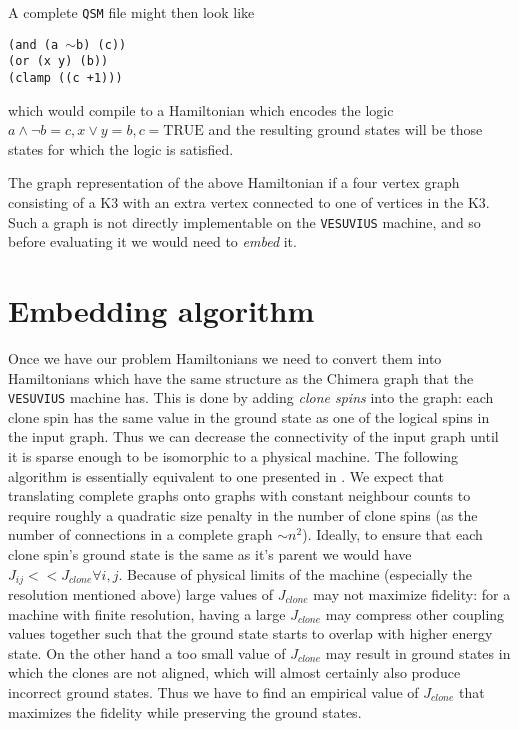A complete \texttt{QSM} file might then look like

\begin{center}
	\texttt{(and (a $\sim$b) (c))}\\
	\texttt{(or (x y) (b))}\\
	\texttt{(clamp ((c +1)))}
\end{center}
which would compile to a Hamiltonian which encodes the logic $a \wedge \neg b = c, x \vee y = b, c = \text{TRUE}$ and the resulting ground states will be those states for which the logic is satisfied.

The graph representation of the above Hamiltonian if a four vertex graph consisting of a K3 with an extra vertex connected to one of vertices in the K3.  Such a graph is not directly implementable on the \texttt{VESUVIUS} machine, and so before evaluating it we would need to \emph{embed} it.

\section{Embedding algorithm}
\label{sec:embed_algo}
Once we have our problem Hamiltonians we need to convert them into Hamiltonians which have the same structure as the Chimera graph that the \texttt{VESUVIUS} machine has.  This is done by adding \emph{clone spins} into the graph: each clone spin has the same value in the ground state as one of the logical spins in the input graph.  
Thus we can decrease the connectivity of the input graph until it is sparse enough to be isomorphic to a physical machine.  The following algorithm is essentially equivalent to one presented in \cite{choi1}.
We expect that translating complete graphs onto graphs with constant neighbour counts to require roughly a quadratic size penalty in the number of clone spins (as the number of connections in a complete graph $\sim n^2$).
Ideally, to ensure that each clone spin's ground state is the same as it's parent we would have $J_{ij} << J_{clone} \forall i,j$.  Because of physical limits of the machine (especially the resolution mentioned above) large values of $J_{clone}$ may not maximize fidelity: for a machine with finite resolution, having a large $J_{clone}$ may compress other coupling values together such that the ground state starts to overlap with higher energy state.  On the other hand a too small value of $J_{clone}$ may result in ground states in which the clones are not aligned, which will almost certainly also produce incorrect ground states. Thus we have to find an empirical value of $J_{clone}$ that maximizes the fidelity while preserving the ground states.

